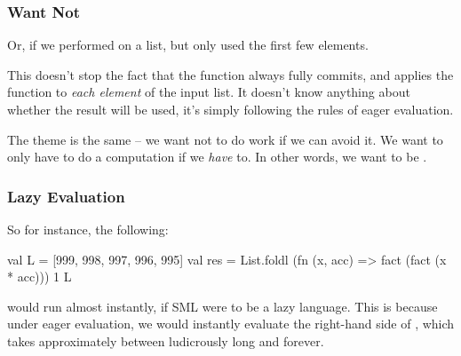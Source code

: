 \documentclass[aspectratio=169]{beamer}
\begin{document}
\begin{frame}[fragile]
  \frametitle{Want Not}

  Or, if we performed  on a list, but only used the first few elements.

  \pause
  \vspace{\fill}

  This doesn't stop the fact that the  function always fully commits,
  and applies the function  to \textit{each element} of the input list.
  It doesn't know anything about whether the result will be used, it's simply
  following the rules of eager evaluation.

  \pause
  \vspace{\fill}

  The theme is the same -- we want not to do work if we can avoid it. We want
  to only have to do a computation if we \textit{have} to. In other words, we
  want to be .
\end{frame}

\begin{frame}[fragile]
  \frametitle{Lazy Evaluation}


  \pause
  \vspace{\fill}

  So for instance, the following:
  \begin{codeblock}
    val L = [999, 998, 997, 996, 995]
    val res =
      List.foldl (fn (x, acc) => fact (fact (x * acc))) 1 L
  \end{codeblock}
  \pause
  would run almost instantly, if SML were to be a lazy language. This is because
  under eager evaluation, we would instantly evaluate the right-hand side of
  , which takes approximately between ludicrously long and forever.
\end{frame}
\end{document}
